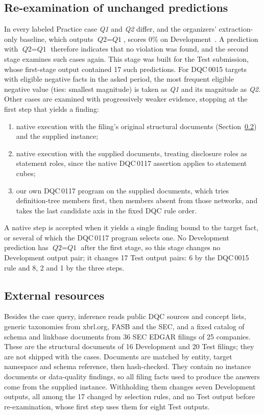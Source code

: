 \documentclass[conference]{IEEEtran}
\newcommand{\DQC}[1]{DQC\,#1}
\newcommand{\QA}{\textit{Q1}}
\newcommand{\QB}{\textit{Q2}}
\begin{document}
\subsection{Re-examination of unchanged predictions}
\label{sec:reexam}
In every labeled Practice case \QA{} and \QB{} differ, and the organizers' extraction-only baseline, which outputs $\QB{}=\QA{}$, scores 0\% on Development~\cite{task3results}. A prediction with $\QB{}=\QA{}$ therefore indicates that no violation was found, and the second stage examines such cases again. This stage was built for the Test submission, whose first-stage output contained 17 such predictions. For \DQC{0015} targets with eligible negative facts in the asked period, the most frequent eligible negative value (ties: smallest magnitude) is taken as \QA{} and its magnitude as \QB{}. Other cases are examined with progressively weaker evidence, stopping at the first step that yields a finding:
\begin{enumerate}
\item native execution with the filing's original structural documents (Section~\ref{sec:source}) and the supplied instance;
\item native execution with the supplied documents, treating disclosure roles as statement roles, since the native \DQC{0117} assertion applies to statement cubes;
\item our own \DQC{0117} program on the supplied documents, which tries definition-tree members first, then members absent from those networks, and takes the last candidate axis in the fixed DQC rule order.
\end{enumerate}
A native step is accepted when it yields a single finding bound to the target fact, or several of which the \DQC{0117} program selects one. No Development prediction has $\QB{}=\QA{}$ after the first stage, so this stage changes no Development output pair; it changes 17 Test output pairs: 6 by the \DQC{0015} rule and 8, 2 and 1 by the three steps.

\subsection{External resources}
\label{sec:source}
Besides the case query, inference reads public DQC sources and concept lists, generic taxonomies from xbrl.org, FASB and the SEC, and a fixed catalog of schema and linkbase documents from 36 SEC EDGAR filings of 25 companies. These are the structural documents of 16 Development and 20 Test filings; they are not shipped with the cases. Documents are matched by entity, target namespace and schema reference, then hash-checked. They contain no instance documents or data-quality findings, so all filing facts used to produce the answers come from the supplied instance. Withholding them changes seven Development outputs, all among the 17 changed by selection rules, and no Test output before re-examination, whose first step uses them for eight Test outputs.
\end{document}
